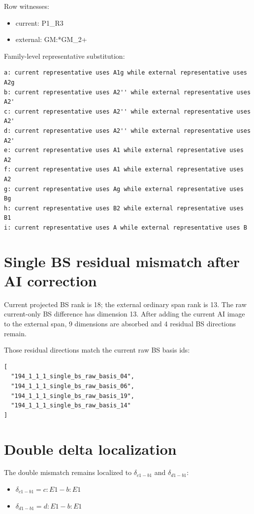 \documentclass[11pt]{article}
\begin{document}
Row witnesses:
\begin{itemize}
\item current: P1\_R3
\item external: GM:*GM\_2+
\end{itemize}

Family-level representative substitution:
\begin{verbatim}
a: current representative uses A1g while external representative uses A2g
b: current representative uses A2'' while external representative uses A2'
c: current representative uses A2'' while external representative uses A2'
d: current representative uses A2'' while external representative uses A2'
e: current representative uses A1 while external representative uses A2
f: current representative uses A1 while external representative uses A2
g: current representative uses Ag while external representative uses Bg
h: current representative uses B2 while external representative uses B1
i: current representative uses A while external representative uses B
\end{verbatim}

\section{Single BS residual mismatch after AI correction}
Current projected BS rank is 18; the external ordinary span rank is 13. The raw current-only BS difference has dimension 13. After adding the current AI image to the external span, 9 dimensions are absorbed and 4 residual BS directions remain.

Those residual directions match the current raw BS basis ids:
\begin{verbatim}
[
  "194_1_1_1_single_bs_raw_basis_04",
  "194_1_1_1_single_bs_raw_basis_06",
  "194_1_1_1_single_bs_raw_basis_19",
  "194_1_1_1_single_bs_raw_basis_14"
]
\end{verbatim}

\section{Double delta localization}
The double mismatch remains localized to $\delta_{c1-b1}$ and $\delta_{d1-b1}$:
\begin{itemize}
\item $\delta_{c1-b1} = c:E1 - b:E1$
\item $\delta_{d1-b1} = d:E1 - b:E1$
\end{itemize}
\end{document}
